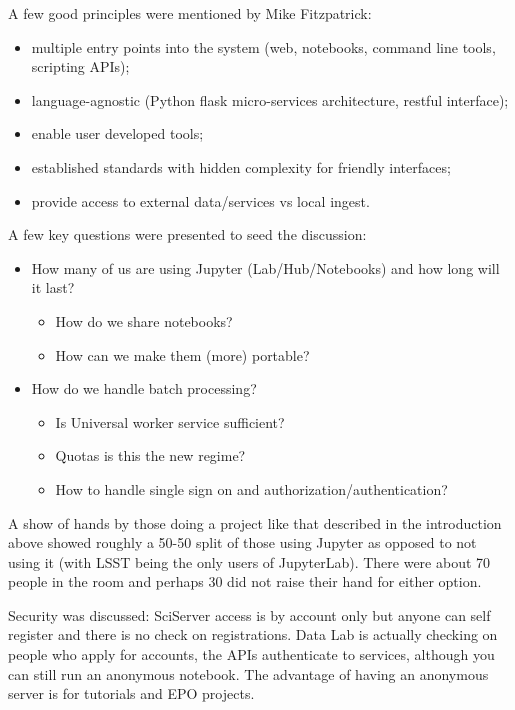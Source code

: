 \documentclass[11pt,twoside]{article}
\begin{document}
A few good principles were mentioned by Mike Fitzpatrick:
\begin{itemize}
\item multiple entry points into the system (web, notebooks, command line tools, scripting APIs);
\item language-agnostic (Python flask micro-services architecture, restful interface);
\item  enable user developed tools;
\item  established standards with hidden complexity for friendly interfaces;
\item  provide access to external data/services vs local ingest.
\end{itemize}


A few key questions were presented to seed the discussion:
\begin{itemize}
\item How many of us are using Jupyter (Lab/Hub/Notebooks) and how long will it last?
        \begin{itemize}
        \item How do we share notebooks?
        \item How can we make them (more) portable?
        \end{itemize}
\item How do we handle batch processing?
        \begin{itemize}
        \item Is Universal worker service sufficient?
        \item Quotas is this the new regime?
        \item How to handle single sign on and authorization/authentication?
        \end{itemize}

\end{itemize}


A show of hands by those doing a project like that described in the introduction above  showed roughly a 50-50 split of those using Jupyter as opposed to not using it (with LSST being the only users of JupyterLab). There were about 70 people in the room and perhaps 30 did not raise their hand for either option.

Security was discussed:
SciServer access is by account only but anyone can self register and there is no check on registrations.
Data Lab  is actually checking on people who apply for accounts, the APIs authenticate to services, although you can still run an anonymous notebook. The advantage of having an anonymous server is for tutorials and EPO projects.
\end{document}
